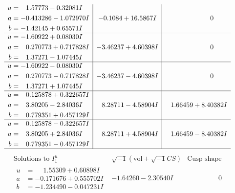 \documentclass[1p]{elsarticle_modified}
\theoremstyle{definition}
\newcommand{\I}{\sqrt{-1}}
\begin{document}
$$\begin{array}{c|c|c}
\begin{aligned}
u &= \phantom{-}1.57773 - 0.32081 I \\
a &= -0.413286 - 1.072970 I \\
b &= -1.42145 + 0.65571 I\end{aligned}
 & -0.1084 + 16.5867 I & \phantom{-0.000000 } 0 \\ \hline\begin{aligned}
u &= -1.60922 + 0.08030 I \\
a &= \phantom{-}0.270773 + 0.717828 I \\
b &= \phantom{-}1.37271 - 1.07445 I\end{aligned}
 & -3.46237 + 4.60398 I & \phantom{-0.000000 } 0 \\ \hline\begin{aligned}
u &= -1.60922 - 0.08030 I \\
a &= \phantom{-}0.270773 - 0.717828 I \\
b &= \phantom{-}1.37271 + 1.07445 I\end{aligned}
 & -3.46237 - 4.60398 I & \phantom{-0.000000 } 0 \\ \hline\begin{aligned}
u &= \phantom{-}0.125878 + 0.322657 I \\
a &= \phantom{-}3.80205 - 2.84036 I \\
b &= \phantom{-}0.779351 + 0.457129 I\end{aligned}
 & \phantom{-}8.28711 - 4.58904 I & \phantom{-}1.66459 + 8.40382 I \\ \hline\begin{aligned}
u &= \phantom{-}0.125878 - 0.322657 I \\
a &= \phantom{-}3.80205 + 2.84036 I \\
b &= \phantom{-}0.779351 - 0.457129 I\end{aligned}
 & \phantom{-}8.28711 + 4.58904 I & \phantom{-}1.66459 - 8.40382 I\\
 \hline 
 \end{array}$$\newpage$$\begin{array}{c|c|c}  
\text{Solutions to }I^u_{1}& \I (\text{vol} + \sqrt{-1}CS) & \text{Cusp shape}\\
 \hline 
\begin{aligned}
u &= \phantom{-}1.55309 + 0.60898 I \\
a &= -0.171676 + 0.555702 I \\
b &= -1.234490 - 0.047231 I\end{aligned}
 & -1.64260 - 2.30540 I & \phantom{-0.000000 } 0 \\ \hline\begin{aligned}

\end{aligned}
\end{array}$$
\end{document}
